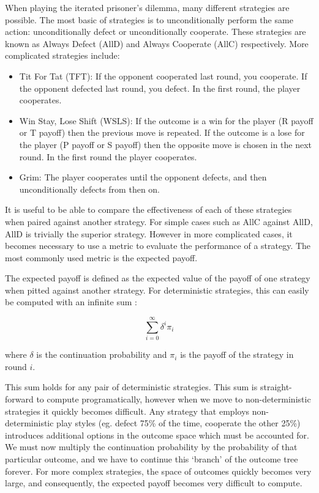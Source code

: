 \documentclass[a4paper,12pt]{article}
\begin{document}
When playing the iterated prisoner's dilemma, many different strategies are possible.
The most basic of strategies is to unconditionally perform the same action: unconditionally defect or unconditionally cooperate.
These strategies are known as Always Defect (AllD) and Always Cooperate (AllC) respectively.
More complicated strategies include:

\begin{itemize}
    \item Tit For Tat (TFT): If the opponent cooperated last round, you cooperate. If the opponent defected last round, you defect. In the first round, the player cooperates.
    \item Win Stay, Lose Shift (WSLS): If the outcome is a win for the player (R payoff or T payoff) then the previous move is repeated. If the outcome is a lose for the player (P payoff or S payoff) then the opposite move is chosen in the next round. In the first round the player cooperates.
    \item Grim: The player cooperates until the opponent defects, and then unconditionally defects from then on.
\end{itemize}

It is useful to be able to compare the effectiveness of each of these strategies when paired against another strategy.
For simple cases such as AllC against AllD, AllD is trivially the superior strategy.
However in more complicated cases, it becomes necessary to use a metric to evaluate the performance of a strategy.
The most commonly used metric is the expected payoff.

The expected payoff is defined as the expected value of the payoff of one strategy when pitted against another strategy.
For deterministic strategies, this can easily be computed with an infinite sum \cite{garciaandtraulsen}:

\begin{equation}
    \sum_{i=0}^{\infty} \delta^i \pi_i
\end{equation}

where $\delta$ is the continuation probability and $\pi_i$ is the payoff of the strategy in round $i$.

This sum holds for any pair of deterministic strategies.
This sum is straight-forward to compute programatically, however when we move to non-deterministic strategies it quickly becomes difficult.
Any strategy that employs non-deterministic play styles (eg. defect 75\% of the time, cooperate the other 25\%) introduces additional options in the outcome space which must be accounted for.
We must now multiply the continuation probability by the probability of that particular outcome, and we have to continue this `branch' of the outcome tree forever.
For more complex strategies, the space of outcomes quickly becomes very large, and consequently, the expected payoff becomes very difficult to compute.
\end{document}
